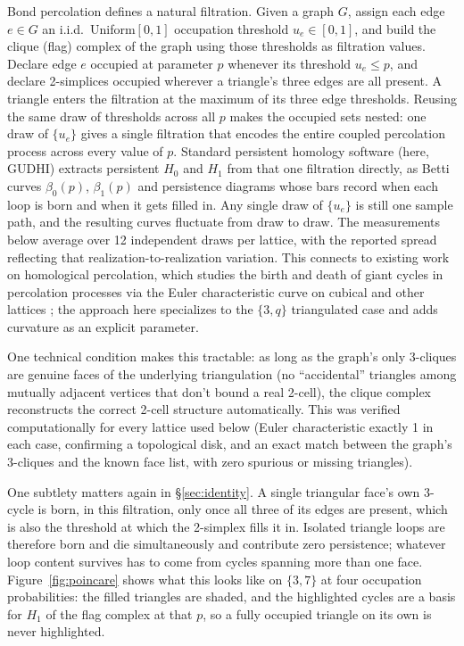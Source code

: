\documentclass[11pt]{article}
\begin{document}
Bond percolation defines a natural filtration. Given a graph $G$, assign each edge $e\in G$ an i.i.d.\ Uniform$[0,1]$ occupation threshold $u_e\in[0,1]$, and build the clique (flag) complex of the graph using those thresholds as filtration values. Declare edge $e$ occupied at parameter $p$ whenever its threshold $u_e\le p$, and declare 2-simplices occupied wherever a triangle's three edges are all present. A triangle enters the filtration at the maximum of its three edge thresholds. Reusing the same draw of thresholds across all $p$ makes the occupied sets nested: one draw of $\{u_e\}$ gives a single filtration that encodes the entire coupled percolation process across every value of $p$. Standard persistent homology software (here, GUDHI) extracts persistent $H_0$ and $H_1$ from that one filtration directly, as Betti curves $\beta_0(p)$, $\beta_1(p)$ and persistence diagrams whose bars record when each loop is born and when it gets filled in. Any single draw of $\{u_e\}$ is still one sample path, and the resulting curves fluctuate from draw to draw. The measurements below average over 12 independent draws per lattice, with the reported spread reflecting that realization-to-realization variation. This connects to existing work on homological percolation, which studies the birth and death of giant cycles in percolation processes via the Euler characteristic curve on cubical and other lattices \citep{bobrowski2020}; the approach here specializes to the $\{3,q\}$ triangulated case and adds curvature as an explicit parameter.

One technical condition makes this tractable: as long as the graph's only 3-cliques are genuine faces of the underlying triangulation (no ``accidental'' triangles among mutually adjacent vertices that don't bound a real 2-cell), the clique complex reconstructs the correct 2-cell structure automatically. This was verified computationally for every lattice used below (Euler characteristic exactly 1 in each case, confirming a topological disk, and an exact match between the graph's 3-cliques and the known face list, with zero spurious or missing triangles).

One subtlety matters again in \S\ref{sec:identity}. A single triangular face's own 3-cycle is born, in this filtration, only once all three of its edges are present, which is also the threshold at which the 2-simplex fills it in. Isolated triangle loops are therefore born and die simultaneously and contribute zero persistence; whatever loop content survives has to come from cycles spanning more than one face. Figure~\ref{fig:poincare} shows what this looks like on $\{3,7\}$ at four occupation probabilities: the filled triangles are shaded, and the highlighted cycles are a basis for $H_1$ of the flag complex at that $p$, so a fully occupied triangle on its own is never highlighted.
\end{document}
